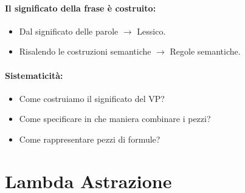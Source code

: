
\paragraph{Il significato della frase è costruito:}
\begin{itemize}
  \item Dal significato delle parole $\rightarrow$ Lessico. 
  \item Risalendo le costruzioni semantiche $\rightarrow$ Regole semantiche.
\end{itemize}

\paragraph{Sistematicità:}

\begin{itemize}
  \item Come costruiamo il significato del VP? 
  \item Come specificare in che maniera combinare i pezzi? 
  \item Come rappresentare pezzi di formule?
\end{itemize}

\section{Lambda Astrazione}









